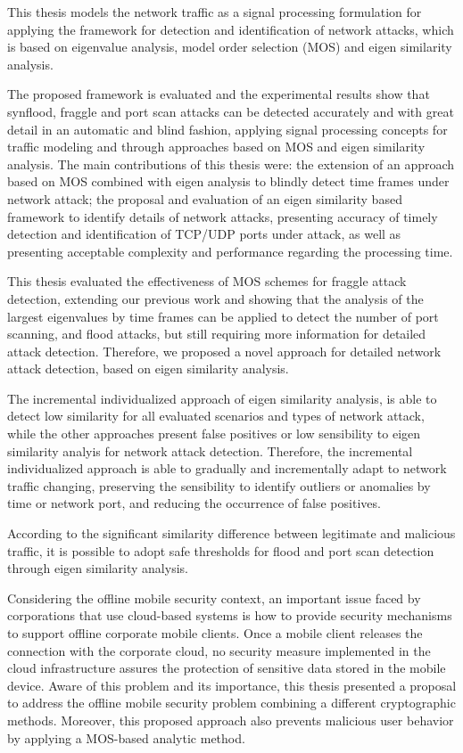 This thesis models the network traffic as a signal processing formulation for applying the framework for detection and identification of network attacks, which is based on eigenvalue analysis, model order selection (MOS) and eigen similarity analysis.

The proposed framework is evaluated and the experimental results show that synflood, fraggle and port scan attacks can be detected accurately and with great detail in an automatic and blind fashion, applying signal processing concepts for traffic modeling and through approaches based on MOS and eigen similarity analysis. The main contributions of this thesis were: the extension of an approach based on MOS combined with eigen analysis to blindly detect time frames under network attack; the proposal and evaluation of an eigen similarity based framework to identify details of network attacks, presenting accuracy of timely detection and identification of TCP/UDP ports under attack, as well as presenting acceptable complexity and performance regarding the processing time.

This thesis evaluated the effectiveness of MOS schemes for fraggle attack detection, extending our previous work \cite{tenorio2013greatest} and showing that the analysis of the largest eigenvalues by time frames can be applied to detect the number of port scanning, and flood attacks, but still requiring more information for detailed attack detection. Therefore, we proposed a novel approach for detailed network attack detection, based on eigen similarity analysis.

The incremental individualized approach of eigen similarity analysis, is able to detect low similarity for all evaluated scenarios and types of network attack, while the other approaches present false positives or low sensibility to eigen similarity analyis for network attack detection. Therefore, the incremental individualized approach is able to gradually and incrementally adapt to network traffic changing, preserving the sensibility to identify outliers or anomalies by time or network port, and reducing the occurrence of false positives.

According to the significant similarity difference between legitimate and malicious traffic, it is possible to adopt safe thresholds for flood and port scan detection through eigen similarity analysis.

Considering the offline mobile security context, an important issue faced by corporations that use cloud-based systems is how to provide security mechanisms to support offline corporate mobile clients. Once a mobile client releases the connection with the corporate cloud, no security measure implemented in the cloud infrastructure assures the protection of sensitive data stored in the mobile device. Aware of this problem and its importance, this thesis presented a proposal to address the offline mobile security problem combining a different cryptographic methods. Moreover, this proposed approach also prevents malicious user behavior by applying a MOS-based analytic method. 

